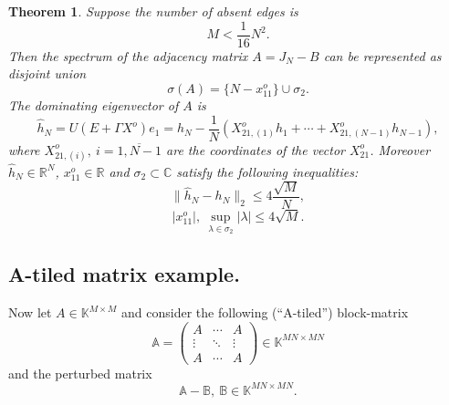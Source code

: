 \documentclass[a4paper]{jpconf}
\newtheorem{nkjpcsthm}{Theorem}
\begin{document}
\begin{nkjpcsthm}
    Suppose the number of absent edges is
    \[ M < \frac{1}{16} N^2. \]
    Then the spectrum of the adjacency matrix \( A = J_N - B \)
        can be represented as disjoint union
    \[
        \sigma(A) = \{ N - x_{11}^o \} \cup \sigma_2.
    \]
    The dominating eigenvector of \( A \) is
    \[
        \hat{h}_N = U(E+\Gamma X^o) e_1 =
            h_N - \frac1N (X_{21,(1)}^o h_1 + \cdots + X_{21, (N{-}1)}^o h_{N{-}1}),
    \]
    where \( X_{21,(i)}^o,\ i=\overline{1,N{-}1} \) are the coordinates
    of the vector \( X_{21}^o \).
    Moreover \( \hat{h}_N\in\mathbb{R}^{N} \),
    \( x_{11}^o\in\mathbb{R} \) and \( \sigma_2\subset\mathbb{C} \)
    satisfy the following inequalities:
    \[
        \|\hat{h}_N - h_N\|_2 \leq 4\frac{\sqrt{M}}{N},
    \]
    \[
        \lvert x_{11}^o \rvert,
        \ \sup_{\lambda\in\sigma_2} \lvert\lambda\rvert \leq 4\sqrt{M}.
    \]
\end{nkjpcsthm}

\subsection*{A-tiled matrix example.}

Now let \( A\in\mathbb{K}^{M{\times}M} \)
    and consider the following (``A-tiled'') block-matrix
    \[
        \mathbb{A} =
        \begin{pmatrix}
            A & \cdots & A \\
            \vdots & \ddots & \vdots \\
            A & \cdots & A
        \end{pmatrix}
        \in\mathbb{K}^{{MN}{\times}{MN}}
    \]
    and the perturbed matrix
    \[
        \mathbb{A} - \mathbb{B},\ \mathbb{B}\in\mathbb{K}^{{MN}{\times}{MN}}.
    \]
\end{document}
